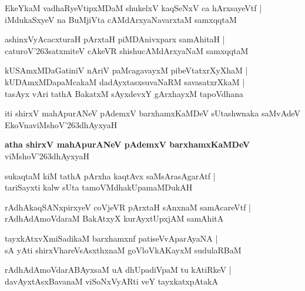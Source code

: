 \begin{shloka}
EkeYkaM vadhaRyeVtipxMDaM shukelxV kaqSeNxV ca hArxsayeVtf |\\
iMdukaSxyeV na BuMjiVta cAMdArxyaNavarxtaM samxqqtaM
\end{shloka}

\begin{shloka}
ashinxVyAcacxturaH pArxtaH piMDAnivxparx samAhitaH |\\
caturoV\char'263satxmiteV cAkeVR shishucAMdArxyaNaM samxqqtaM 
\end{shloka}

\begin{shloka}
kUSAmxMDaGatiniV nAriV paMcagavayxM pibeVtatxrXyXhaM |\\
kUDAmxMDapaMcakaM dadAyxtasxsuvaNaRM savasatxrXkaM |\\
tasAyx vAri tathA BakatxM sAyxdevxY gArxhayxM tapoVdhana
\end{shloka}
iti shirxV mahApurANeV pAdemxV barxhamxKaMDeV sUtashwnaka saMvAdeV EkoVnaviMshoV\char'263dhAyxyaH

\begin{center}
\textbf{\large atha shirxV mahApurANeV pAdemxV barxhamxKaMDeV}\\
viMshoV\char'263dhAyxyaH
\end{center}

\setcounter{shloka}{0}
\begin{shloka}
sukaqtaM kiM tathA pArxha kaqtAvx saMsArasAgarAtf |\\
tariSayxti kalw sUta tamoVMdhakUpamaMDukAH
\end{shloka}

\begin{shloka}
rAdhAkaqSANxpirxyeV coVjeVR pArxtaH sAnxnaM samAcareVtf |\\
rAdhAdAmoVdaraM BakAtxyX kurAyxtUpxjAM samAhitA 
\end{shloka}

\begin{shloka}
tayxkAtxvXmiSadikaM barxhamxnf patiseVvAparAyaNA |\\
sA yAti shirxVhareVsAsxthxnaM goVloVkAKayxM sudulaRBaM
\end{shloka}

\begin{shloka}
rAdhAdAmoVdarABAyxsaM uA dhUpadiVpaM tu kAtiRkeV |\\
davAyxtAsxBavanaM viSoNxVyARti veY tayxkatxpAtakA
\end{shloka}


